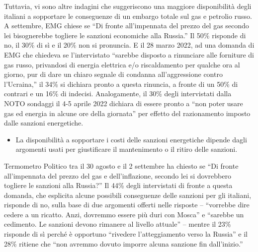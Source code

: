 \documentclass[
]{book}
\providecommand{\tightlist}{%
  \setlength{\itemsep}{0pt}\setlength{\parskip}{0pt}}
\begin{document}
Tuttavia, vi sono altre indagini che suggeriscono una maggiore disponibilità degli italiani a sopportare le conseguenze di un embargo totale sul gas e petrolio russo. A settembre, EMG chiese se ``Di fronte all'impennata del prezzo del gas secondo lei bisognerebbe togliere le sanzioni economiche alla Russia.'' Il 50\% risponde di no, il 30\% di sì e il 20\% non si pronuncia. E il 28 marzo 2022, ad una domanda di EMG che chiedeva se l'intervistato ``sarebbe disposto a rinunciare alle forniture di gas russo, privandosi di energia elettrica e/o riscaldamento per qualche ora al giorno, pur di dare un chiaro segnale di condanna all'aggressione contro l'Ucraina,'' il 34\% si dichiara pronto a questa rinuncia, a fronte di un 50\% di contrari e un 16\% di indecisi. Analogamente, il 30\% degli intervistati dalla NOTO sondaggi il 4-5 aprile 2022 dichiara di essere pronto a ``non poter usare gas ed energia in alcune ore della giornata'' per effetto del razionamento imposto dalle sanzioni energetiche.

\begin{itemize}
\tightlist
\item
  La disponibilità a sopportare i costi delle sanzioni energetiche dipende dagli argomenti usati per giustificare il mantenimento o il ritiro delle sanzioni.
\end{itemize}

Termometro Politico tra il 30 agosto e il 2 settembre ha chiesto se ``Di fronte all'impennata del prezzo del gas e dell'inflazione, secondo lei si dovrebbero togliere le sanzioni alla Russia?'' Il 44\% degli intervistati di fronte a questa domanda, che esplicita alcune possibili conseguenze delle sanzioni per gli italiani, risponde di no, sulla base di due argomenti offerti nelle risposte -- ``vorrebbe dire cedere a un ricatto. Anzi, dovremmo essere più duri con Mosca'' e ``sarebbe un cedimento. Le sanzioni devono rimanere al livello attuale'' -- mentre il 23\% risponde di sì perché è opportuno ``rivedere l'atteggiamento verso la Russia'' e il 28\% ritiene che ``non avremmo dovuto imporre alcuna sanzione fin dall'inizio.''
\end{document}
